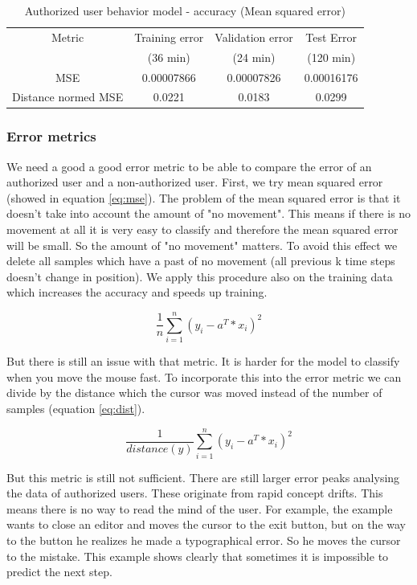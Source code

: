 \documentclass[conference]{IEEEtran}
\begin{document}
\begin{table}[!t]
\renewcommand{\arraystretch}{1.3}
\caption{Authorized user behavior model - accuracy (Mean squared error)}
\label{table_model_quality}
\centering
\begin{tabular}{|c||c||c||c|}
\hline
Metric & Training error & Validation error & Test Error\\
 & (36 min) & (24 min) & (120 min)\\
\hline
MSE & 0.00007866 & 0.00007826 & 0.00016176\\
\hline
Distance normed MSE & 0.0221 & 0.0183 & 0.0299\\
\hline
\end{tabular}
\end{table}


\subsubsection{Error metrics}
We need a good a good error metric to be able to compare the error of an authorized user and a non-authorized user. First, we try mean squared error (showed in equation \ref{eq:mse}). The problem of the mean squared error is that it doesn't take into account the amount of "no movement". This means if there is no movement at all it is very easy to classify and therefore the mean squared error will be small. So the amount of "no movement" matters. To avoid this effect we delete all samples which have a past of no movement (all previous k time steps doesn't change in position). We apply this procedure also on the training data which increases the accuracy and speeds up training.

\begin{equation}
\label{eq:mse}
\frac{1}{n} \sum_{i=1}^{n}  (y_{i} - a^T*x_{i})^2
\end{equation}

But there is still an issue with that metric. It is harder for the model to classify when you move the mouse fast. To incorporate this into the error metric we can divide by the distance which the cursor was moved instead of the number of samples (equation \ref{eq:dist}).

\begin{equation}
\label{eq:dist}
\frac{1}{distance(y)} \sum_{i=1}^{n}  (y_{i} - a^T*x_{i})^2
\end{equation}

But this metric is still not sufficient. There are still larger error peaks analysing the data of authorized users. These originate from rapid concept drifts. This means there is no way to read the mind of the user. For example, the example wants to close an editor and moves the cursor to the exit button, but on the way to the button he realizes he made a typographical error. So he moves the cursor to the mistake. This example shows clearly that sometimes it is impossible to predict the next step.
\end{document}
